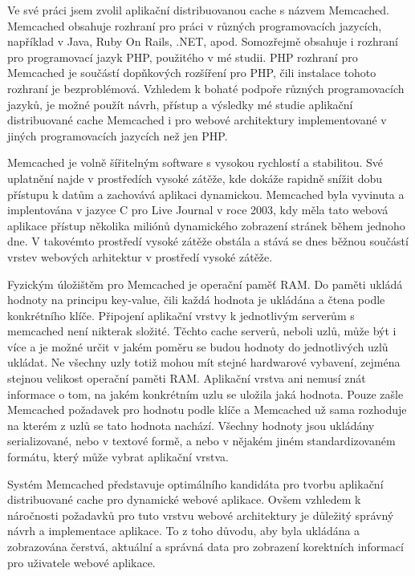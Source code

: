 \documentclass[12pt]{article}
\begin{document}
Ve své práci jsem zvolil aplikační distribuovanou cache s názvem Memcached. Memcached obsahuje rozhraní pro práci v různých programovacích jazycích, například v Java, Ruby On Rails, .NET, apod. Somozřejmě obsahuje i rozhraní pro programovací jazyk PHP, použitého v mé studii. PHP rozhraní pro Memcached je součástí dopňkových rozšíření pro PHP, čili instalace tohoto rozhraní je bezproblémová. Vzhledem k bohaté podpoře různých programovacích jazyků, je možné použít návrh, přístup a výsledky mé studie aplikační distribuované cache Memcached i pro webové architektury implementované v jiných programovacích jazycích než jen PHP.

Memcached je volně šířitelným software s vysokou rychlostí a stabilitou. Své uplatnění najde v prostředích vysoké zátěže, kde dokáže rapidně snížit dobu přístupu k datům a zachovává aplikaci dynamickou. Memcached byla vyvinuta a implentována v jazyce C pro Live Journal v roce 2003, kdy měla tato webová aplikace přístup několika miliónů dynamického zobrazení stránek během jednoho dne. V takovémto prostředí vysoké zátěže obstála a stává se dnes běžnou součástí vrstev webových arhitektur v prostředí vysoké zátěže.

Fyzickým úložištěm pro Memcached je operační paměť RAM. Do paměti ukládá hodnoty na principu key-value, čili každá hodnota je ukládána a čtena podle konkrétního klíče. Připojení aplikační vrstvy k jednotlivým serverům s memcached není nikterak složité. Těchto cache serverů, neboli uzlů, může být i více a je možné určit v jakém poměru se budou hodnoty do jednotlivých uzlů ukládat. Ne všechny uzly totiž mohou mít stejné hardwarové vybavení, zejména stejnou velikost operační paměti RAM. Aplikační vrstva ani nemusí znát informace o tom, na jakém konkrétním uzlu se uložila jaká hodnota. Pouze zašle Memcached požadavek pro hodnotu podle klíče a Memcached už sama rozhoduje na kterém z uzlů se tato hodnota nachází. Všechny hodnoty jsou ukládány serializované, nebo v textové formě, a nebo v nějakém jiném standardizovaném formátu, který může vybrat aplikační vrstva.\cite{memcached}

Systém Memcached představuje optimálního kandidáta pro tvorbu aplikační distribuované cache pro dynamické webové aplikace. Ovšem vzhledem k náročnosti požadavků pro tuto vrstvu webové architektury je důležitý správný návrh a implementace aplikace. To z toho důvodu, aby byla ukládána a zobrazována čerstvá, aktuální a správná data pro zobrazení korektních informací pro uživatele webové aplikace.
\end{document}
